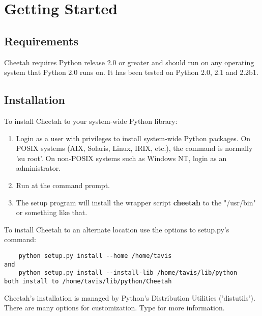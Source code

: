 \section{Getting Started}
\label{gettingStarted}

\subsection{Requirements}
\label{gettingStarted.requirements}

Cheetah requires Python release 2.0 or greater and should run on any
operating system that Python 2.0 runs on.  It has been tested on
Python 2.0, 2.1 and 2.2b1.

\subsection{Installation}
\label{gettingStarted.install}

To install Cheetah to your system-wide Python library:
\begin{enumerate}
\item Login as a user with privileges to install system-wide Python packages.
     On POSIX systems (AIX, Solaris, Linux, IRIX, etc.), the command is normally
     'su root'.  On non-POSIX systems such as Windows NT, login as an
     administrator.

\item Run  at the command prompt.

\item The setup program will install the wrapper script {\bf cheetah} to the
     "/usr/bin" or something like that.
\end{enumerate}


To install Cheetah to an alternate location use the options to setup.py's
 command:
\begin{verbatim}
    python setup.py install --home /home/tavis 
and
    python setup.py install --install-lib /home/tavis/lib/python
both install to /home/tavis/lib/python/Cheetah
\end{verbatim}

Cheetah's installation is managed by Python's Distribution Utilities
('distutils').  There are many options for customization.  Type  for more information.

